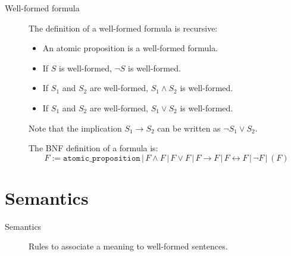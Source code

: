 \begin{description}
    \item[Well-formed formula] 
        The definition of a well-formed formula is recursive:
        \begin{itemize}
            \item An atomic proposition is a well-formed formula.
            \item If $S$ is well-formed, $\lnot S$ is well-formed.
            \item If $S_1$ and $S_2$ are well-formed, $S_1 \land S_2$ is well-formed.
            \item If $S_1$ and $S_2$ are well-formed, $S_1 \vee S_2$ is well-formed.
        \end{itemize}

        Note that the implication $S_1 \rightarrow S_2$ can be written as $\lnot S_1 \vee S_2$.

        The BNF definition of a formula is:
        \[
            F := \texttt{atomic\_proposition} \,|\, F \land F \,|\, F \vee F \,|\,  
                F \rightarrow F \,|\, F \leftrightarrow F \,|\, \lnot F \,|\, (F) 
        \]
\end{description}


\section{Semantics}

\begin{description}
    \item[Semantics] 
        Rules to associate a meaning to well-formed sentences.
\end{description}

